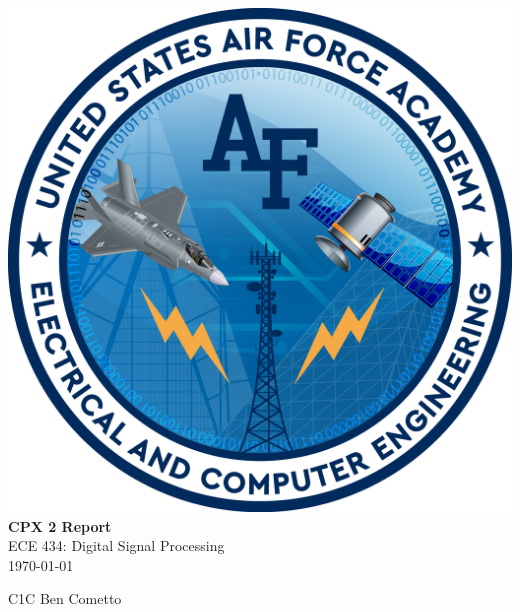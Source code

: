 \documentclass{article}
\newcommand\thisclass{CPX 2 Report} %
\begin{document}
	

\hypersetup{pageanchor=false} %
\begin{center}
\includegraphics[scale=0.25]{./figures/ECE-logo.png} \\[24pt]
\huge{\textbf{\thisclass}} \\[12pt]
\Large{ECE 434: Digital Signal Processing} \\[4pt]
\Large{\today} \\[4pt]

\vfill

\Large{C1C Ben Cometto}
\end{center} 

\newpage


\thispagestyle{empty}
\setcounter{page}{0}
\tableofcontents

\newpage
\listoffigures

\newpage
\listoftables

\newpage


\hypersetup{pageanchor=true} %


 
\newpage
 
\newpage
 
\newpage
 
\newpage
 
\newpage
  
\newpage
 








\end{document}
